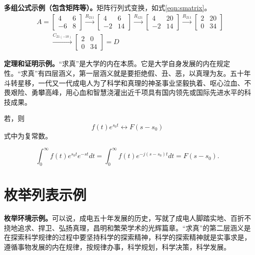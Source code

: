     {\bfseries 多组公式示例（包含矩阵等）。}矩阵行列式变换，如式\eqref{eqn:smatrix}。
    \begin{equation}
        \begin{split}
            & A = \begin{bmatrix} 4 & 6 \\ -6 & 8\end{bmatrix} \xrightarrow{R_{211}}
                  \begin{bmatrix} 4 & 6 \\ -2 & 14\end{bmatrix} \xrightarrow{R_{121}}
                  \begin{bmatrix} 4 & 20 \\ -2 & 14\end{bmatrix} \xrightarrow{R_{211}}
                  \begin{bmatrix} 2 & 20 \\ 0 & 34\end{bmatrix} \\
            &\phantom{A=} \xrightarrow{C_{21(-10)}}
                           \begin{bmatrix} 2 & 0 \\ 0 & 34\end{bmatrix} = D
        \end{split}
        \label{eqn:smatrix}
	\end{equation}
    
    {\bfseries 定理和证明示例。}“求真”是大学的内在本质。它是大学自身发展的内在规定性。“求真”有四层涵义，第一层涵义就是要拒绝假、丑、恶，以真理为友。五十年斗转星移，一代又一代成电人为了科学和真理的神圣事业坚毅执着、呕心泣血、不畏艰险、勇攀高峰，用心血和智慧浇灌出近千项具有国内领先或国际先进水平的科技成果。
    \begin{dingli}
        若，则
        \begin{equation}
            f(t)e^{s_0 t} \leftrightarrow F(s-s_0)
        \end{equation}
        式中为复常数。
    \end{dingli}
    \begin{zhengming}
        \[
            \int^\infty_0 f(t)e^{s_0 t}e^{-st} dt = \int^\infty_0 f(t)e^{-j(s-s_0)t} dt
            = F(s-s_0).
        \]
    \end{zhengming}
    
\section{枚举列表示例}
	{\bfseries 枚举环境示例。}可以说，成电五十年发展的历史，写就了成电人脚踏实地、百折不挠地追求、捍卫、弘扬真理，昌明和繁荣学术的光辉篇章。“求真”的第二层涵义是在探索科学规律的过程中要坚持科学的探索精神，科学的探索精神就是实事求是，遵循事物发展的内在规律，按规律办事，科学规划，科学决策，科学发展。
	
